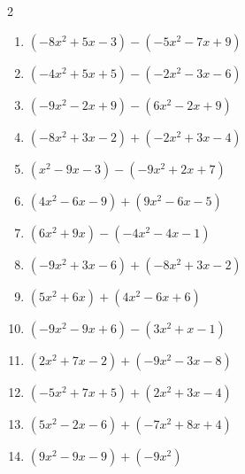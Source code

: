\begin{multicols}{2}
\begin{enumerate}
  \item $(-8x^{2}+5x-3)-(-5x^{2}-7x+9)$


  \item $(-4x^{2}+5x+5)-(-2x^{2}-3x-6)$


  \item $(-9x^{2}-2x+9)-(6x^{2}-2x+9)$


  \item $(-8x^{2}+3x-2)+(-2x^{2}+3x-4)$


  \item $(x^{2}-9x-3)-(-9x^{2}+2x+7)$


  \item $(4x^{2}-6x-9)+(9x^{2}-6x-5)$


  \item $(6x^{2}+9x)-(-4x^{2}-4x-1)$


\columnbreak %

  \item $(-9x^{2}+3x-6)+(-8x^{2}+3x-2)$


  \item $(5x^{2}+6x)+(4x^{2}-6x+6)$


  \item $(-9x^{2}-9x+6)-(3x^{2}+x-1)$


  \item $(2x^{2}+7x-2)+(-9x^{2}-3x-8)$


  \item $(-5x^{2}+7x+5)+(2x^{2}+3x-4)$


  \item $(5x^{2}-2x-6)+(-7x^{2}+8x+4)$


  \item $(9x^{2}-9x-9)+(-9x^{2})$


\end{enumerate}
\end{multicols}

